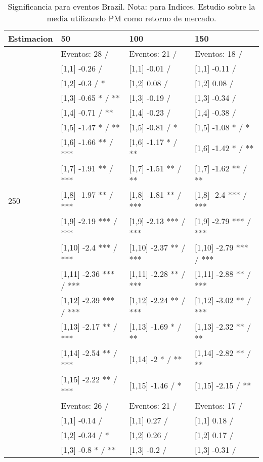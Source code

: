 \begin{table}

\caption{Significancia para eventos Brazil. Nota: para Indices. Estudio sobre la media utilizando PM como retorno de mercado.}
\centering
\begin{tabular}[t]{llll}
\toprule
Estimacion & 50 & 100 & 150\\
\midrule
 & Eventos:  28 / & Eventos:  21 / & Eventos:  18 /\\
 & {}[1,1] -0.26  / & {}[1,1] -0.01  / & {}[1,1] -0.11  /\\
 & {}[1,2] -0.3  / * & {}[1,2] 0.08  / & {}[1,2] 0.08  /\\
 & {}[1,3] -0.65 * / ** & {}[1,3] -0.19  / & {}[1,3] -0.34  /\\
 & {}[1,4] -0.71  / ** & {}[1,4] -0.23  / & {}[1,4] -0.38  /\\
\addlinespace
 & {}[1,5] -1.47 * / ** & {}[1,5] -0.81  / * & {}[1,5] -1.08 * / *\\
 & {}[1,6] -1.66 ** / *** & {}[1,6] -1.17 * / ** & {}[1,6] -1.42 * / **\\
 & {}[1,7] -1.91 ** / *** & {}[1,7] -1.51 ** / ** & {}[1,7] -1.62 ** / **\\
250 & {}[1,8] -1.97 ** / *** & {}[1,8] -1.81 ** / *** & {}[1,8] -2.4 *** / ***\\
 & {}[1,9] -2.19 *** / *** & {}[1,9] -2.13 *** / *** & {}[1,9] -2.79 *** / ***\\
\addlinespace
 & {}[1,10] -2.4 *** / *** & {}[1,10] -2.37 ** / *** & {}[1,10] -2.79 *** / ***\\
 & {}[1,11] -2.36 *** / *** & {}[1,11] -2.28 ** / *** & {}[1,11] -2.88 ** / ***\\
 & {}[1,12] -2.39 *** / *** & {}[1,12] -2.24 ** / *** & {}[1,12] -3.02 ** / ***\\
 & {}[1,13] -2.17 ** / *** & {}[1,13] -1.69 * / ** & {}[1,13] -2.32 ** / **\\
 & {}[1,14] -2.54 ** / *** & {}[1,14] -2 * / ** & {}[1,14] -2.82 ** / **\\
\addlinespace
 & {}[1,15] -2.22 ** / *** & {}[1,15] -1.46  / * & {}[1,15] -2.15  / **\\
 & Eventos:  26 / & Eventos:  21 / & Eventos:  17 /\\
 & {}[1,1] -0.14  / & {}[1,1] 0.27  / & {}[1,1] 0.18  /\\
 & {}[1,2] -0.34  / * & {}[1,2] 0.26  / & {}[1,2] 0.17  /\\
 & {}[1,3] -0.8 * / ** & {}[1,3] -0.2  / & {}[1,3] -0.31  /\\

\end{tabular}
\end{table}
